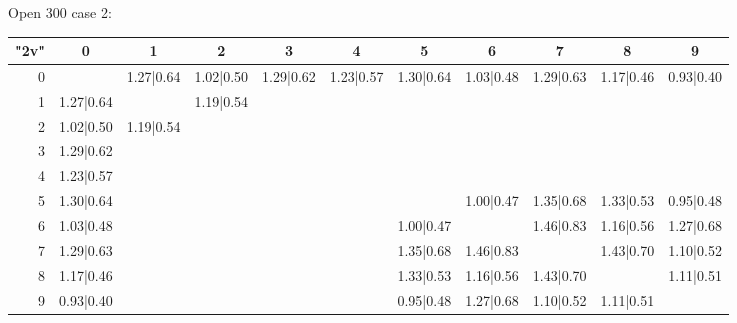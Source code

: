 \begin{table}
	
		\vspace{0.6cm}
	
	Open 300 case 2:
	
	\vspace{0.6cm}
	
	\begin{tabular}{|r||c|c|c|c|c|c|c|c|c|c|}\hline
		{\bf "2v"} & 0 & 1 & 2 & 3 & 4 & 5 & 6 & 7 & 8 & 9 \\\hline\hline
0 & &1.27|0.64 &1.02|0.50 &1.29|0.62 &1.23|0.57 &1.30|0.64 &1.03|0.48 &1.29|0.63 &1.17|0.46 &0.93|0.40  \\\hline
1 &1.27|0.64 & &1.19|0.54 & & & & & & &  \\\hline
2 &1.02|0.50 &1.19|0.54 & & & & & & & &  \\\hline
3 &1.29|0.62 & & & & & & & & &  \\\hline
4 &1.23|0.57 & & & & & & & & &  \\\hline
5 &1.30|0.64 & & & & & &1.00|0.47 &1.35|0.68 &1.33|0.53 &0.95|0.48  \\\hline
6 &1.03|0.48 & & & & &1.00|0.47 & &1.46|0.83 &1.16|0.56 &1.27|0.68  \\\hline
7 &1.29|0.63 & & & & &1.35|0.68 &1.46|0.83 & &1.43|0.70 &1.10|0.52  \\\hline
8 &1.17|0.46 & & & & &1.33|0.53 &1.16|0.56 &1.43|0.70 & &1.11|0.51  \\\hline
9 &0.93|0.40 & & & & &0.95|0.48 &1.27|0.68 &1.10|0.52 &1.11|0.51 &  \\\hline
	\end{tabular}
	
			\vspace{0.6cm}
\end{table}




\clearpage



